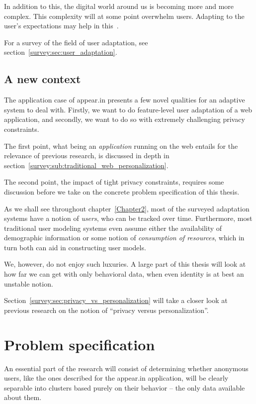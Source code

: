 In addition to this, the digital world around us is becoming more and more complex. This complexity will at some point overwhelm users. Adapting to the user's expectations may help in this~\cite{Vrieze}.

For a survey of the field of user adaptation, see section~\ref{survey:sec:user_adaptation}.

\subsection{A new context}
\label{intro:sub:adaptation_context}

The application case of appear.in presents a few novel qualities for an adaptive system to deal with. Firstly, we want to do feature-level user adaptation of a web application, and secondly, we want to do so with extremely challenging privacy constraints.

The first point, what being an \emph{application} running on the web entails for the relevance of previous research, is discussed in depth in section~\ref{survey:sub:traditional_web_personalization}.

The second point, the impact of tight privacy constraints, requires some discussion before we take on the concrete problem specification of this thesis.

As we shall see throughout chapter~\ref{Chapter2}, most of the surveyed adaptation systems have a notion of \emph{users}, who can be tracked over time. Furthermore, most traditional user modeling systems even assume either the availability of demographic information or some notion of \emph{consumption of resources}, which in turn both can aid in constructing user models.

We, however, do not enjoy such luxuries. A large part of this thesis will look at how far we can get with only behavioral data, when even identity is at best an unstable notion.

Section~\ref{survey:sec:privacy_vs_personalization} will take a closer look at previous research on the notion of ``privacy versus personalization''.

\section{Problem specification}
\label{intro:sec:problem_specification}

An essential part of the research will consist of determining whether anonymous users, like the ones described for the appear.in application, will be clearly separable into clusters based purely on their behavior -- the only data available about them.

